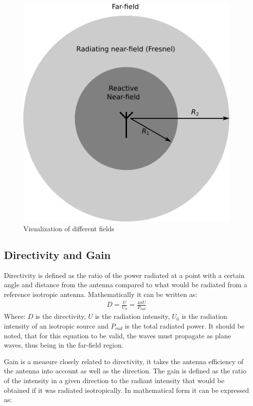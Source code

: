\begin{figure}[htbp]
  \centering
  \includegraphics[scale=1]{img/analysis/radiationfields}
  \caption{Visualization of different fields\cite{balanis2012antenna}}
  \label{fig:field-regions}
\end{figure}

\subsection{Directivity and Gain}
\label{subsec:dir_gain}
Directivity is defined as the ratio of the power radiated at a  point with a certain angle and distance from the antenna compared to what would be radiated from a reference isotropic antenna. Mathematically it can be written as: 
\begin{align}
  D = \frac{U}{U_0} = \frac{4 \pi U}{P_{rad}} 
\end{align}
Where: $D$ is the directivity, $U$ is the radiation intensity, $U_0$ is the radiation intensity of an isotropic source and $P_{rad}$ is the total radiated power. It should be noted, that for this equation to be valid, the waves must propagate as plane waves, thus being in the far-field region. 

Gain is a measure closely related to directivity, it takes the antenna efficiency of the antenna into account as well as the direction. The gain is defined as the ratio of the intensity in a given direction to the radiant intensity that would be obtained if it was radiated isotropically. In mathematical form it can be expressed as: 

